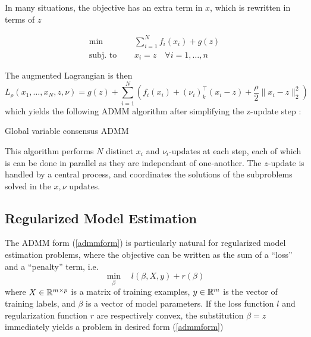 \documentclass[11pt]{article}
\begin{document}
In many situations, the objective has an extra term in $x$, which is rewritten in 
terms of $z$ 

\begin{equation} \label{gen_seperable}
\begin{aligned}
        \min \quad & \sum_{i=1}^N f_i(x_i) + g(z)\\
        \textrm{subj. to } \quad & x_i = z \quad \forall i = 1, \ldots, n
\end{aligned}
\end{equation}

The augmented Lagrangian is then 
\[ 
    L_\rho(x_1, \ldots, x_N, z, \nu) = 
    g(z) + \sum_{i=1}^N \left( f_i(x_i) + (\nu_i)_k^\top(x_i - z) + \frac{\rho}{2} \|x_i - z\|_2^2 \right)
\]
which yields the following ADMM algorithm after simplifying the z-update step \cite{boydistributed}:

\begin{algorithm}[H]
    \caption{Global variable consensus ADMM}

    \SetAlgoNoLine

\end{algorithm}
\vspace{5pt}
This algorithm performs $N$ distinct $x_i$ and $\nu_i$-updates at each step, each of which is 
can be done in parallel as they are independant of one-another. The $z$-update is handled by a central 
process, and coordinates the solutions of the subproblems solved in the $x, \nu$ updates.

\subsection{Regularized Model Estimation}

The ADMM form (\ref{admmform}) is particularly natural for regularized model estimation problems, 
where the objective can be written as the sum of a ``loss'' and a ``penalty'' term, i.e.
\[
    \min_{\beta} \quad {l(\beta, X, y) + r(\beta)}
\]
where $X \in \mathbb{R}^{m \times p}$ is a matrix of training examples, $y \in \mathbb{R}^m$ is the vector of training
labels, and $\beta$ is a vector of model parameters. If the loss function $l$ and regularization function 
$r$ are respectively convex, the substitution $\beta = z$ immediately yields a problem in desired form (\ref{admmform})
\end{document}
